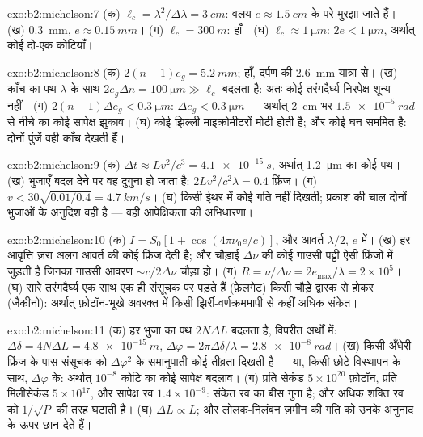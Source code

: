 \begin{solution}{exo:b2:michelson:7}
(क) $\ell_c = \lambda^2/\Delta\lambda = \qty{3}{cm}$: वलय $e \approx \qty{1.5}{cm}$ के परे मुरझा जाते हैं। (ख)
\qty{0.3}{mm}, $e \approx \qty{0.15}{mm}$। (ग) $\ell_c = \qty{300}{m}$: हाँ। (घ) $\ell_c \approx \qty{1}{\micro m}$:
$2e < \qty{1}{\micro m}$, अर्थात् कोई दो-एक कोटियाँ।
\end{solution}

\begin{solution}{exo:b2:michelson:8}
(क) $2(n - 1)e_g = \qty{5.2}{mm}$; हाँ, दर्पण की \qty{2.6}{mm} यात्रा से। (ख) काँच का
पथ $\lambda$ के साथ $2e_g\Delta n = \qty{100}{\micro m} \gg \ell_c$ बदलता है: अतः कोई
तरंगदैर्घ्य-निरपेक्ष शून्य नहीं। (ग) $2(n - 1)\Delta e_g < \qty{0.3}{\micro m}$: $\Delta e_g <
\qty{0.3}{\micro m}$ --- अर्थात् \qty{2}{cm} भर $\qty{1.5e-5}{rad}$ से नीचे का कोई सापेक्ष झुकाव। (घ) कोई
झिल्ली माइक्रोमीटरों मोटी होती है; और कोई घन सममित है: दोनों पुंजें
वही काँच देखती हैं।
\end{solution}

\begin{solution}{exo:b2:michelson:9}
(क) $\Delta t \approx Lv^2/c^3 = \qty{4.1e-15}{s}$, अर्थात् \qty{1.2}{\micro m} का कोई पथ। (ख) भुजाएँ
बदल देने पर वह दुगुना हो जाता है: $2Lv^2/c^2\lambda = 0.4$ फ्रिंज। (ग) $v < 30\sqrt{0.01/0.4} =
\qty{4.7}{km/s}$। (घ) किसी ईथर में कोई गति नहीं दिखती; प्रकाश की चाल
दोनों भुजाओं के अनुदिश वही है --- वही आपेक्षिकता की अभिधारणा।
\end{solution}

\begin{solution}{exo:b2:michelson:10}
(क) $I = S_0[1 + \cos(4\pi\nu_0e/c)]$, और आवर्त $\lambda/2$, $e$ में। (ख) हर आवृत्ति
ज़रा अलग आवर्त की कोई फ्रिंज देती है; और चौड़ाई
$\Delta\nu$ की कोई गाउसी पट्टी ऐसी फ्रिंजों में जुड़ती है जिनका गाउसी आवरण $\sim c/2\Delta\nu$ चौड़ा हो।
(ग) $R = \nu/\Delta\nu = 2e_{\max}/\lambda = 2 \times 10^5$। (घ) सारे तरंगदैर्घ्य एक साथ
एक ही संसूचक पर पड़ते हैं (फ़ेलगेट) किसी चौड़े द्वारक से होकर (जैकीनो):
अर्थात् फ़ोटॉन-भूखे अवरक्त में किसी झिर्री-वर्णक्रममापी से कहीं अधिक
संकेत।
\end{solution}

\begin{solution}{exo:b2:michelson:11}
(क) हर भुजा का पथ $2N\Delta L$ बदलता है, विपरीत अर्थों में: $\Delta\delta = 4N\Delta L
= \qty{4.8e-15}{m}$, $\Delta\varphi = 2\pi\Delta\delta/\lambda = \qty{2.8e-8}{rad}$। (ख) किसी अँधेरी
फ्रिंज के पास संसूचक को $\Delta\varphi^2$ के समानुपाती कोई तीव्रता दिखती है --- या,
किसी छोटे विस्थापन के साथ, $\Delta\varphi$ के: अर्थात् $10^{-8}$ कोटि का कोई सापेक्ष बदलाव। (ग)
प्रति सेकंड $5 \times 10^{20}$ फ़ोटॉन, प्रति मिलीसेकंड $5 \times 10^{17}$, और सापेक्ष
रव $1.4 \times 10^{-9}$: संकेत रव का बीस गुना है; और अधिक शक्ति
रव को $1/\sqrt P$ की तरह घटाती है। (घ) $\Delta L \propto L$; और लोलक-निलंबन
ज़मीन की गति को उनके अनुनाद के ऊपर छान देते हैं।
\end{solution}

